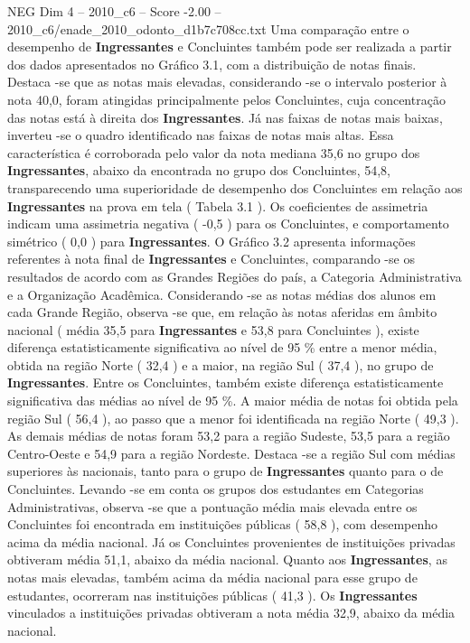 \begin{textsample}{NEG Dim 4 – 2010\_c6 – Score -2.00 – 2010\_c6/enade\_2010\_odonto\_d1b7c708cc.txt}
Uma comparação entre o desempenho de \textbf{Ingressantes} e Concluintes também pode ser realizada a partir dos dados apresentados no Gráfico 3.1, com a distribuição de notas finais.
Destaca -se que as notas mais elevadas, considerando -se o intervalo posterior à nota 40,0, foram atingidas principalmente pelos Concluintes, cuja concentração das notas está à direita dos \textbf{Ingressantes}.
Já nas faixas de notas mais baixas, inverteu -se o quadro identificado nas faixas de notas mais altas.
Essa característica é corroborada pelo valor da nota mediana 35,6 no grupo dos \textbf{Ingressantes}, abaixo da encontrada no grupo dos Concluintes, 54,8, transparecendo uma superioridade de desempenho dos Concluintes em relação aos \textbf{Ingressantes} na prova em tela ( Tabela 3.1 ).
Os coeficientes de assimetria indicam uma assimetria negativa ( -0,5 ) para os Concluintes, e comportamento simétrico ( 0,0 ) para \textbf{Ingressantes}.
O Gráfico 3.2 apresenta informações referentes à nota final de \textbf{Ingressantes} e Concluintes, comparando -se os resultados de acordo com as Grandes Regiões do país, a Categoria Administrativa e a Organização Acadêmica.
Considerando -se as notas médias dos alunos em cada Grande Região, observa -se que, em relação às notas aferidas em âmbito nacional ( média 35,5 para \textbf{Ingressantes} e 53,8 para Concluintes ), existe diferença estatisticamente significativa ao nível de 95 \% entre a menor média, obtida na região Norte ( 32,4 ) e a maior, na região Sul ( 37,4 ), no grupo de \textbf{Ingressantes}.
Entre os Concluintes, também existe diferença estatisticamente significativa das médias ao nível de 95 \%.
A maior média de notas foi obtida pela região Sul ( 56,4 ), ao passo que a menor foi identificada na região Norte ( 49,3 ).
As demais médias de notas foram 53,2 para a região Sudeste, 53,5 para a região Centro-Oeste e 54,9 para a região Nordeste.
Destaca -se a região Sul com médias superiores às nacionais, tanto para o grupo de \textbf{Ingressantes} quanto para o de Concluintes.
Levando -se em conta os grupos dos estudantes em Categorias Administrativas, observa -se que a pontuação média mais elevada entre os Concluintes foi encontrada em instituições públicas ( 58,8 ), com desempenho acima da média nacional.
Já os Concluintes provenientes de instituições privadas obtiveram média 51,1, abaixo da média nacional.
Quanto aos \textbf{Ingressantes}, as notas mais elevadas, também acima da média nacional para esse grupo de estudantes, ocorreram nas instituições públicas ( 41,3 ).
Os \textbf{Ingressantes} vinculados a instituições privadas obtiveram a nota média 32,9, abaixo da média nacional.

\end{textsample}
